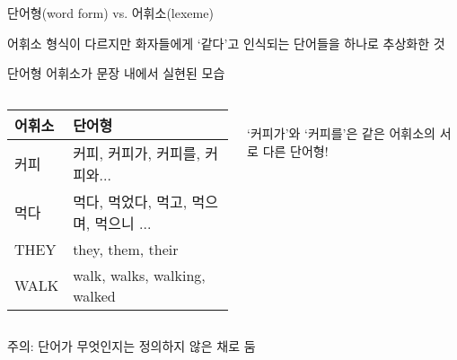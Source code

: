 \documentclass[11pt, aspectratio=169]{beamer}
\begin{document}
\begin{frame}[t]{단어형(word form) vs. 어휘소(lexeme)}
  \begin{block}{어휘소}
    형식이 다르지만 화자들에게 ‘같다’고 인식되는 단어들을 하나로 추상화한 것
  \end{block}
  \begin{block}{단어형}
    어휘소가 문장 내에서 실현된 모습
  \end{block}
  \begin{columns}
    \begin{column}{0.6\textwidth}
      \begin{tabular}{ll}
        \hline
        \textbf{어휘소} & \textbf{단어형} \\
        \hline
        커피 & 커피, 커피가, 커피를, 커피와... \\
        먹다 & 먹다, 먹었다, 먹고, 먹으며, 먹으니 ... \\
        THEY & they, them, their \\
        WALK & walk, walks, walking, walked \\
        \hline
      \end{tabular}      
    \end{column}
    \begin{column}{0.33\textwidth}
       \\ ‘커피가’와 ‘커피를’은 같은 어휘소의 서로 다른 단어형! \\
    \end{column}
  \end{columns}
  \begin{center}
    {\small 주의: 단어가 무엇인지는 정의하지 않은 채로 둠}     
  \end{center}
\end{frame}
\end{document}
